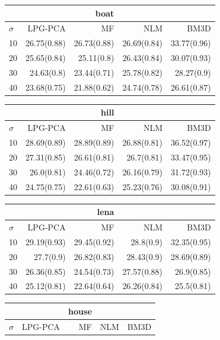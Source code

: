 {\tiny
\noindent\begin{minipage}{.5\linewidth}
\begin{tabular}{lrrrr}
\toprule &&boat\\ \midrule
$\sigma$&LPG-PCA&MF&NLM&BM3D\\
\midrule
10&26.75(0.88)&26.73(0.88)&26.69(0.84)&33.77(0.96)\\
20&25.65(0.84)&25.11(0.8)&26.43(0.84)&30.07(0.93)\\
30&24.63(0.8)&23.44(0.71)&25.78(0.82)&28.27(0.9)\\
40&23.68(0.75)&21.88(0.62)&24.74(0.78)&26.61(0.87)\\
\bottomrule
\end{tabular}
\end{minipage}
\noindent\begin{minipage}{.5\linewidth}
\begin{tabular}{lrrrr}
\toprule &&hill\\ \midrule
$\sigma$&LPG-PCA&MF&NLM&BM3D\\
\midrule
10&28.69(0.89)&28.89(0.89)&26.88(0.81)&36.52(0.97)\\
20&27.31(0.85)&26.61(0.81)&26.7(0.81)&33.47(0.95)\\
30&26.0(0.81)&24.46(0.72)&26.16(0.79)&31.72(0.93)\\
40&24.75(0.75)&22.61(0.63)&25.23(0.76)&30.08(0.91)\\
\bottomrule
\end{tabular}
\end{minipage}
\noindent\begin{minipage}{.5\linewidth}
\begin{tabular}{lrrrr}
\toprule &&lena\\ \midrule
$\sigma$&LPG-PCA&MF&NLM&BM3D\\
\midrule
10&29.19(0.93)&29.45(0.92)&28.8(0.9)&32.35(0.95)\\
20&27.7(0.9)&26.82(0.83)&28.43(0.9)&28.69(0.89)\\
30&26.36(0.85)&24.54(0.73)&27.57(0.88)&26.9(0.85)\\
40&25.12(0.81)&22.64(0.64)&26.26(0.84)&25.5(0.81)\\
\bottomrule
\end{tabular}
\end{minipage}
\noindent\begin{minipage}{.5\linewidth}
\begin{tabular}{lrrrr}
\toprule &&house\\ \midrule
$\sigma$&LPG-PCA&MF&NLM&BM3D\\

\end{tabular}
\end{minipage}}
